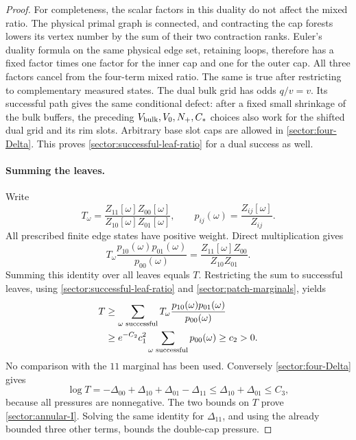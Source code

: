 \begin{proof}
For completeness, the scalar factors in this duality do not affect
the mixed ratio.  The physical primal graph is connected, and
contracting the cap forests lowers its vertex number by the sum of
their two contraction ranks.  Euler's duality formula on the same
physical edge set, retaining loops, therefore has a fixed factor
times one factor for the inner cap and one for the outer cap.  All
three factors cancel from the four-term mixed ratio.  The same is
true after restricting to complementary measured states.  The
dual bulk grid has odds $q/v=v$.  Its successful path gives the
same conditional defect: after a fixed small shrinkage of the bulk
buffers, the preceding $V_{\rm bulk},V_0,N_+,C_*$ choices also work
for the shifted dual grid and its rim slots.  Arbitrary base slot caps
are allowed in
\eqref{sector:four-Delta}.  This proves
\eqref{sector:successful-leaf-ratio} for a dual success as well.

\paragraph{Summing the leaves.}
Write
\[
 T_\omega=\frac{Z_{11}[\omega]Z_{00}[\omega]}
                  {Z_{10}[\omega]Z_{01}[\omega]},\qquad
 p_{ij}(\omega)=\frac{Z_{ij}[\omega]}{Z_{ij}}.
\]
All prescribed finite edge states have positive weight.  Direct
multiplication gives
\[
 T_\omega\frac{p_{10}(\omega)p_{01}(\omega)}{p_{00}(\omega)}
 =\frac{Z_{11}[\omega]Z_{00}}{Z_{10}Z_{01}}.
\]
Summing this identity over all leaves equals $T$.  Restricting the
sum to successful leaves, using
\eqref{sector:successful-leaf-ratio} and
\eqref{sector:patch-marginals}, yields
\begin{align}
 T&\ge\sum_{\omega\text{ successful}}
       T_\omega\frac{p_{10}(\omega)p_{01}(\omega)}{p_{00}(\omega)}
       \notag\\
  &\ge e^{-C_2}c_1^2
       \sum_{\omega\text{ successful}}p_{00}(\omega)
   \ge c_2>0.
 \label{sector:annealed-lower-bound}
\end{align}
No comparison with the $11$ marginal has been used.
Conversely \eqref{sector:four-Delta} gives
\[
 \log T=-\Delta_{00}+\Delta_{10}+\Delta_{01}-\Delta_{11}
 \le\Delta_{10}+\Delta_{01}\le C_3,
\]
because all pressures are nonnegative.  The two bounds on $T$ prove
\eqref{sector:annular-I}.  Solving the same identity for
$\Delta_{11}$, and using the already bounded three other terms,
bounds the double-cap pressure.


\end{proof}
